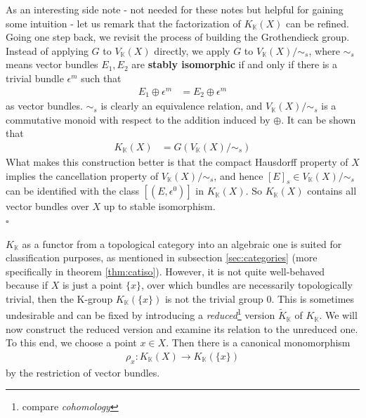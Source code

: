\begin{rem}
\label{rem:stableiso}
As an interesting side note - not needed for these notes but helpful for gaining some intuition - let us remark that the factorization of $K_{\mathbb{K}}(X)$ can be refined.
Going one step back, we revisit the process of building the Grothendieck group.
Instead of applying $G$ to $V_{\mathbb{K}}(X)$ directly, we apply $G$ to $V_{\mathbb{K}}(X)/\sim_{s}$, where $\sim_{s}$ means vector bundles $E_{1},E_{2}$ are \textbf{stably isomorphic} if and only if there is a trivial bundle $\epsilon^{m}$ such that
\begin{align*}
  E_{1}
  \oplus
  \epsilon^{m}
  &=
  E_{2}
  \oplus
  \epsilon^{m}
\end{align*}
  as vector bundles.
$\sim_{s}$ is clearly an equivalence relation, and $V_{\mathbb{K}}(X)/\sim_{s}$ is a commutative monoid with respect to the addition induced by $\oplus$.
It can be shown that \begin{align*}
  K_{\mathbb{K}}(X)
  &= G(V_{\mathbb{K}}(X)/\sim_{s})
\end{align*}
What makes this construction better is that the compact Hausdorff property of $X$ implies the cancellation property of $V_{\mathbb{K}}(X)/\sim_{s}$, and hence $[E]_{s} \in V_{\mathbb{K}}(X)/\sim_{s}$ can be identified with the class $[(E,\epsilon^{0})]$ in $K_{\mathbb{K}}(X)$.
So $K_{\mathbb{K}}(X)$ contains all vector bundles over $X$ up to stable isomorphism.
\\
\phantom{proven}
\hfill
$\square$
\end{rem}
$K_{\mathbb{K}}$ as a functor from a topological category into an algebraic one is suited for classification purposes, as mentioned in subsection \ref{sec:categories} (more specifically in theorem \ref{thm:catiso}).
However, it is not quite well-behaved because if $X$ is just a point $\lbrace x \rbrace$, over which bundles are necessarily topologically trivial, then the K-group $K_{\mathbb{K}}(\lbrace x \rbrace)$ is not the trivial group $0$.
This is sometimes undesirable and can be fixed by introducing a \textit{reduced}\footnote{compare \textit{cohomology}} version $\tilde{K}_{\mathbb{K}}$ of $K_{\mathbb{K}}$.
We will now construct the reduced version and examine its relation to the unreduced one.
To this end, we choose a point $x \in X$.
Then there is a canonical monomorphism
\begin{align*}
  \rho_{x}
  \colon
  K_{\mathbb{K}}(X)
  \to
  K_{\mathbb{K}}(\lbrace x \rbrace)
\end{align*}
by the restriction of vector bundles.
